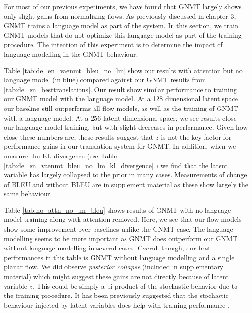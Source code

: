 For most of our previous experiments, we have found that \ac{GNMT} largely shows only slight gains from normalizing flows. As previously discussed in chapter 3, \ac{GNMT} trains a language model as part of the system.  In this section, we train \ac{GNMT} models that do not optimize this language model as part of the training procedure. The intention of this experiment is to determine the impact of language modelling in the \ac{GNMT} behaviour.

Table \ref{tab:de_en_vaenmt_bleu_no_lm} show our results with attention but no language model (in blue) compared against our \ac{GNMT} results from \ref{tab:de_en_besttranslations}. Our result show similar performance to training our \ac{GNMT} model with the language model. At a 128 dimensional latent space our baseline still outperforms all flow models, as well as the training of \ac{GNMT} with a language model. At a 256 latent dimensional space, we see results close our language model training, but with slight decreases in performance. Given how close these numbers are, these results suggest that $z$ is not the key factor for performance gains in our translation system for \ac{GNMT}. In addition, when we measure the KL divergence (see Table \ref{tab:de_en_vaenmt_bleu_no_lm_kl_divergence} ) we find that the latent variable has largely collapsed to the prior in many cases. Measurements of change of BLEU and without BLEU are in supplement material as these show largely the same behaviour. 

Table \ref{tab:no_attn_no_lm_bleu} shows results of \ac{GNMT} with no language model training along with attention removed.  Here, we see that our flow models show some improvement over baselines unlike the \ac{GNMT} case. The language modelling seems to be more important as \ac{GNMT} does outperform our \ac{GNMT} without language modelling in several cases. Overall though, our best performances in this table is \ac{GNMT} without language modelling and a single planar flow. We did observe \textit{posterior collapse} (included in supplementary material) which might suggest these gains are not directly because of latent variable $z$. This could be simply a bi-product of the stochastic behavior due to the training procedure. It has been previously suggested that the stochastic behaviour injected by latent variables does help with training performance \cite{Zhang2016VNMT}. 



